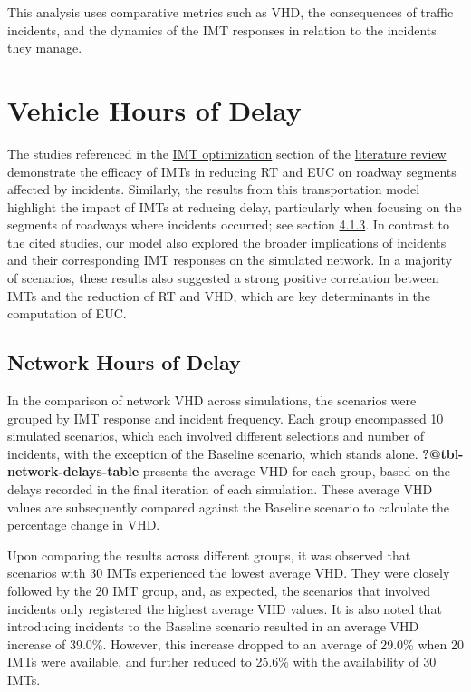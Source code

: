 \documentclass[fancy, oneside, mastersfancy, ms]{byuthesis}
\begin{document}
This analysis uses comparative metrics such as VHD, the consequences of
traffic incidents, and the dynamics of the IMT responses in relation to
the incidents they manage.

\hypertarget{vehicle-hours-of-delay}{%
\section{Vehicle Hours of Delay}\label{vehicle-hours-of-delay}}

The studies referenced in the \protect\hyperlink{sec-lit_imt_opt}{IMT
optimization} section of the
\protect\hyperlink{sec-literature}{literature review} demonstrate the
efficacy of IMTs in reducing RT and EUC on roadway segments affected by
incidents. Similarly, the results from this transportation model
highlight the impact of IMTs at reducing delay, particularly when
focusing on the segments of roadways where incidents occurred; see
section \protect\hyperlink{sec-impacted}{4.1.3}. In contrast to the
cited studies, our model also explored the broader implications of
incidents and their corresponding IMT responses on the simulated
network. In a majority of scenarios, these results also suggested a
strong positive correlation between IMTs and the reduction of RT and
VHD, which are key determinants in the computation of EUC.

\hypertarget{sec-VHD-Network}{%
\subsection{Network Hours of Delay}\label{sec-VHD-Network}}

In the comparison of network VHD across simulations, the scenarios were
grouped by IMT response and incident frequency. Each group encompassed
10 simulated scenarios, which each involved different selections and
number of incidents, with the exception of the Baseline scenario, which
stands alone. \textbf{?@tbl-network-delays-table} presents the average
VHD for each group, based on the delays recorded in the final iteration
of each simulation. These average VHD values are subsequently compared
against the Baseline scenario to calculate the percentage change in VHD.

Upon comparing the results across different groups, it was observed that
scenarios with 30 IMTs experienced the lowest average VHD. They were
closely followed by the 20 IMT group, and, as expected, the scenarios
that involved incidents only registered the highest average VHD values.
It is also noted that introducing incidents to the Baseline scenario
resulted in an average VHD increase of 39.0\%. However, this increase
dropped to an average of 29.0\% when 20 IMTs were available, and further
reduced to 25.6\% with the availability of 30 IMTs.
\end{document}
